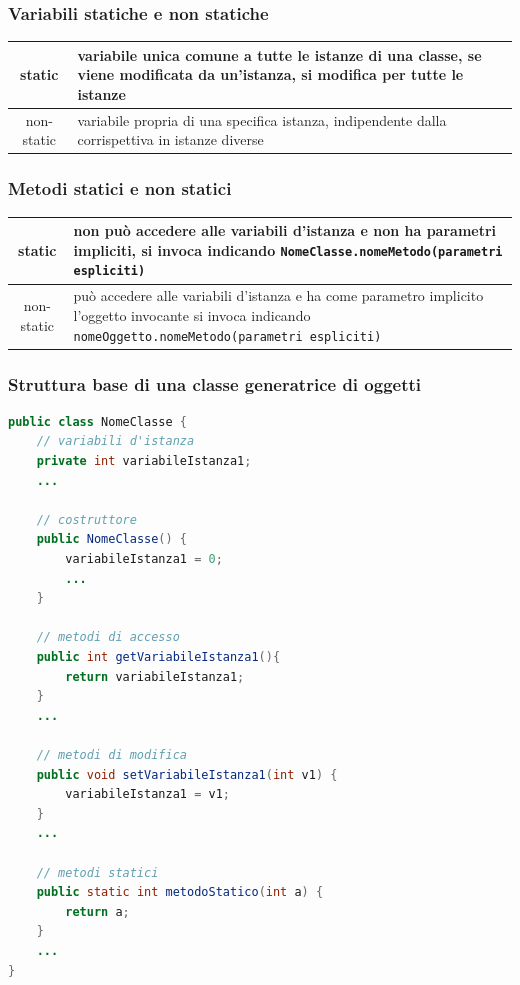 \documentclass[a4paper]{article}
\begin{document}
\subsubsection*{Variabili statiche e non statiche}
\begin{center}
	\begin{tabularx}{\textwidth}{c X}
		static & variabile unica comune a tutte le istanze di una classe, se viene modificata da un'istanza, si modifica per
		tutte le istanze \\
		\midrule
		non-static & variabile propria di una specifica istanza, indipendente dalla corrispettiva in istanze diverse
	\end{tabularx}
\end{center}

\subsubsection*{Metodi statici e non statici}
\begin{center}
	\begin{tabularx}{\textwidth}{c X}
		static & non può accedere alle variabili d'istanza e non ha parametri impliciti, si invoca indicando
		\verb|NomeClasse.nomeMetodo(parametri espliciti)| \\
		\midrule
		non-static & può accedere alle variabili d'istanza e ha come parametro implicito l'oggetto invocante
		si invoca indicando \verb|nomeOggetto.nomeMetodo(parametri espliciti)|
	\end{tabularx}
\end{center}

\subsubsection*{Struttura base di una classe generatrice di oggetti}
\begin{lstlisting}[language=Java]
public class NomeClasse {
	// variabili d'istanza
	private int variabileIstanza1;
	...

	// costruttore
	public NomeClasse() {
		variabileIstanza1 = 0;
		...
	}

	// metodi di accesso
	public int getVariabileIstanza1(){
		return variabileIstanza1;
	}
	...

	// metodi di modifica
	public void setVariabileIstanza1(int v1) {
		variabileIstanza1 = v1;
	}
	...

	// metodi statici
	public static int metodoStatico(int a) {
		return a;
	}
	...
}
\end{lstlisting}
\end{document}
